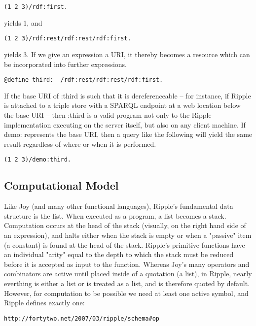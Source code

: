 \documentclass[runningheads]{llncs}
\begin{document}
\begin{verbatim}
(1 2 3)/rdf:first.
\end{verbatim}

yields 1, and

\begin{verbatim}
(1 2 3)/rdf:rest/rdf:rest/rdf:first.
\end{verbatim}

yields 3.  If we give an expression a URI, it thereby becomes a resource which can be incorporated into further expressions.

\begin{verbatim}
@define third:  /rdf:rest/rdf:rest/rdf:first.
\end{verbatim}

If the base URI of :third is such that it is dereferenceable -- for instance, if Ripple is attached to a triple store with a SPARQL endpoint at a web location below the base URI -- then :third is a valid program not only to the Ripple implementation executing on the server itself, but also on any client machine.  If demo: represents the base URI, then a query like the following will yield the same result regardless of where or when it is performed.

\begin{verbatim}
(1 2 3)/demo:third.
\end{verbatim}

\subsection{Computational Model}

Like Joy (and many other functional languages), Ripple's fundamental data structure is the list.  When executed as a program, a list becomes a stack.  Computation occurs at the head of the stack (visually, on the right hand side of an expression), and halts either when the stack is empty or when a "passive" item (a constant) is found at the head of the stack.  Ripple's primitive functions have an individual "arity" equal to the depth to which the stack must be reduced before it is accepted as input to the function.  Whereas Joy's many operators and combinators are active until placed inside of a quotation (a list), in Ripple, nearly everthing is either a list or is treated as a list, and is therefore quoted by default.  However, for computation to be possible we need at least one active symbol, and Ripple defines exactly one:

\begin{verbatim}
http://fortytwo.net/2007/03/ripple/schema#op
\end{verbatim}
\end{document}
